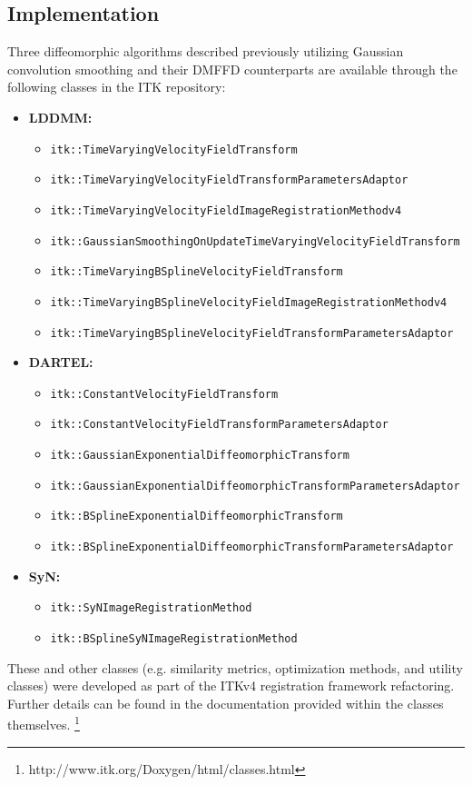 \documentclass{frontiersSCNS}
\begin{document}
\subsection{Implementation}

Three diffeomorphic algorithms described previously utilizing Gaussian convolution smoothing and their DMFFD counterparts are available through the following classes in the ITK repository: 
\begin{itemize}
  \item {\bf LDDMM:}
    \begin{itemize}
      \item {\tt itk::TimeVaryingVelocityFieldTransform} 
      \item {\tt itk::TimeVaryingVelocityFieldTransformParametersAdaptor}
      \item {\tt itk::TimeVaryingVelocityFieldImageRegistrationMethodv4}
      \item {\tt itk::GaussianSmoothingOnUpdateTimeVaryingVelocityFieldTransform}
      \item {\tt itk::TimeVaryingBSplineVelocityFieldTransform} 
      \item {\tt itk::TimeVaryingBSplineVelocityFieldImageRegistrationMethodv4}
      \item {\tt itk::TimeVaryingBSplineVelocityFieldTransformParametersAdaptor}
    \end{itemize}  
  \item {\bf DARTEL:}
    \begin{itemize}
       \item{\tt itk::ConstantVelocityFieldTransform}
       \item{\tt itk::ConstantVelocityFieldTransformParametersAdaptor}
      \item {\tt itk::GaussianExponentialDiffeomorphicTransform} 
      \item {\tt itk::GaussianExponentialDiffeomorphicTransformParametersAdaptor}
      \item {\tt itk::BSplineExponentialDiffeomorphicTransform} 
      \item {\tt itk::BSplineExponentialDiffeomorphicTransformParametersAdaptor}
    \end{itemize}  
  \item {\bf SyN:}
    \begin{itemize}
      \item {\tt itk::SyNImageRegistrationMethod} 
      \item {\tt itk::BSplineSyNImageRegistrationMethod} 
    \end{itemize}  
\end{itemize}
These and other classes (e.g. similarity metrics, optimization methods, and
utility classes) were developed as part of the ITKv4 registration
framework refactoring.  Further details can be found in the documentation
provided within the classes themselves.%
\footnote{
http://www.itk.org/Doxygen/html/classes.html
}
\end{document}
